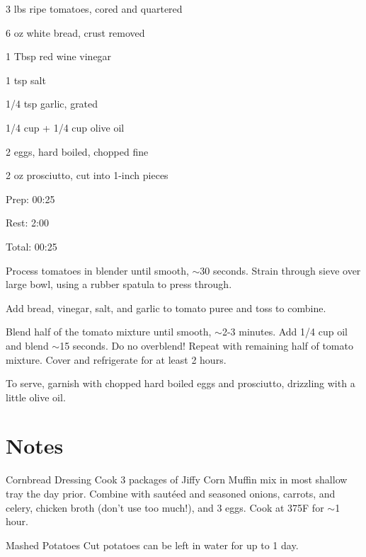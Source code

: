 \documentclass[oneside]{book}  %
\def\thisrecipe{}  %
\newcommand{\recipe}[1]{\section{#1}\def\thisrecipe{: #1}} %
\newcommand{\degF}{\textdegree F\xspace}
\newcommand{\about}{$\sim$}
\begin{document}
\begin{IT}
  \begin{ingredients}
    \item[3 lbs] ripe tomatoes, cored and quartered
    \item[6 oz] white bread, crust removed
    \item[1 Tbsp] red wine vinegar
    \item[1 tsp] salt
    \item[1/4 tsp] garlic, grated
    \item[1/4 cup + 1/4 cup] olive oil
    \item[2] eggs, hard boiled, chopped fine
    \item[2 oz] prosciutto, cut into 1-inch pieces
  \end{ingredients}

  \switchcolumn

  \begin{timeline}
    \item[Prep:]  00:25
    \item[Rest:]  2:00
    \item[Total:] 00:25
  \end{timeline}
\end{IT}

\begin{directions}
  \item Process tomatoes in blender until smooth, \about 30 seconds. Strain
  through sieve over large bowl, using a rubber spatula to press through.

  \item Add bread, vinegar, salt, and garlic to tomato puree and toss to
  combine.

  \item Blend half of the tomato mixture until smooth, \about 2-3 minutes. Add
  1/4 cup oil and blend \about 15 seconds. Do no overblend! Repeat with
  remaining half of tomato mixture. Cover and refrigerate for at least 2 hours.

  \item To serve, garnish with chopped hard boiled eggs and prosciutto,
  drizzling with a little olive oil.
\end{directions}
\recipe{Notes} \label{notes:sides} %
\begin{kitchennotes}
  \item[Cornbread Dressing] \label{recipe:cornbread_dressing}
    Cook 3 packages of Jiffy Corn Muffin mix in most shallow tray the day prior.
    Combine with saut\'eed and seasoned onions, carrots, and celery, chicken
    broth (don't use too much!), and 3 eggs. Cook at 375\degF for \about 1 hour.
  \item[Mashed Potatoes] \label{recipe:mashed_potatoes}
     
    Cut potatoes can be left in water for up to 1 day.
    \todo
\end{kitchennotes}
\end{document}
